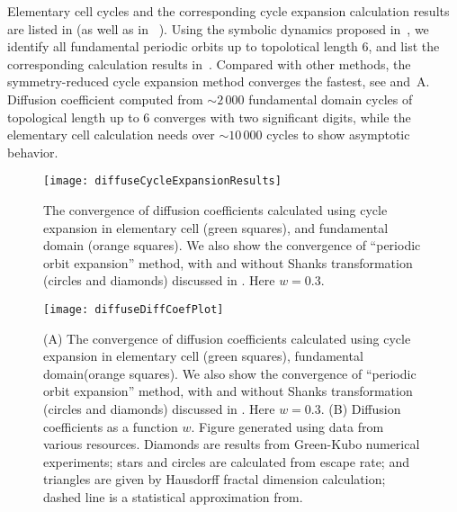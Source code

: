 Elementary cell cycles and the corresponding cycle expansion
calculation results are listed in  (as well as in
~\cite{CGS92}). Using the symbolic
dynamics proposed in~, we
identify all fundamental periodic orbits up to topolotical length 6,
and list the corresponding calculation results 
in~.
Compared with other methods, the symmetry-reduced cycle expansion
method converges
the fastest, see  and \,A. Diffusion
coefficient computed from $\sim2\,000$ fundamental domain cycles of
topological length up to 6 converges with two significant digits,
while the elementary cell calculation needs over $\sim 10\,000$
cycles to show asymptotic behavior.

\begin{figure}
	\texttt{[image: diffuseCycleExpansionResults]}
	\caption{\label{fig-convergence}
    The convergence of diffusion
	coefficients  calculated using cycle		
		expansion in elementary cell (green squares), and fundamental
		domain (orange squares). We also show the convergence of
		``periodic orbit expansion'' method, with and  without Shanks
		transformation (circles and diamonds) discussed in
		.
        Here $w = 0.3$.
		}
\end{figure}
\begin{figure}
	\texttt{[image: diffuseDiffCoefPlot]}
	\caption[Diffusion coefficients computed using cycle expansion
	formulas]{\label{fig-results}
		(A) The convergence of diffusion coefficients  calculated
		using cycle
		expansion in elementary cell (green squares),  fundamental
		domain(orange squares). We  also show the convergence of
		``periodic
		orbit expansion'' method, with and  without Shanks
		transformation
		(circles and diamonds) discussed in .
 		Here $w =
		0.3$. (B) Diffusion coefficients as a function $w$.  Figure
		generated using data from various resources. Diamonds are
		results
		from  Green-Kubo numerical experiments;
		stars and  circles are calculated
		from
		escape rate; and triangles are  given by Hausdorff fractal
		dimension
		calculation; dashed line  is a statistical
		approximation from.}
\end{figure}

